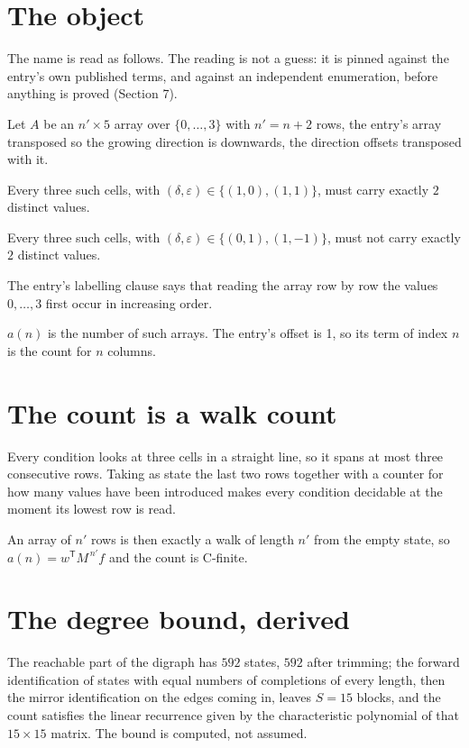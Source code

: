 \documentclass[11pt]{article}
\theoremstyle{definition}
\begin{document}
\section{The object}

The name is read as follows. The reading is not a guess: it is pinned against the entry's own published terms, and against an independent enumeration, before anything is proved (Section 7).

Let $A$ be an $n' \times 5$ array over $\{0,\dots,3\}$ with $n' = n + 2$ rows, the entry's array transposed so the growing direction is downwards, the direction offsets transposed with it.

Every three such cells, with $(\delta,\varepsilon) \in \{(1,0), (1,1)\}$, must carry exactly $2$ distinct values.

Every three such cells, with $(\delta,\varepsilon) \in \{(0,1), (1,-1)\}$, must not carry exactly $2$ distinct values.

The entry's labelling clause says that reading the array row by row the values $0,\dots,3$ first occur in increasing order.

$a(n)$ is the number of such arrays. The entry's offset is 1, so its term of index $n$ is the count for $n$ columns.

\section{The count is a walk count}

Every condition looks at three cells in a straight line, so it spans at most three consecutive rows. Taking as state the last two rows together with a counter for how many values have been introduced makes every condition decidable at the moment its lowest row is read.

An array of $n'$ rows is then exactly a walk of length $n'$ from the empty state, so $a(n) = w^{\mathsf T}M^{\,n'}f$ and the count is C-finite.

\section{The degree bound, derived}

The reachable part of the digraph has $592$ states, $592$ after trimming; the forward identification of states with equal numbers of completions of every length, then the mirror identification on the edges coming in, leaves $S = 15$ blocks, and the count satisfies the linear recurrence given by the characteristic polynomial of that $15\times15$ matrix. The bound is computed, not assumed.
\end{document}
